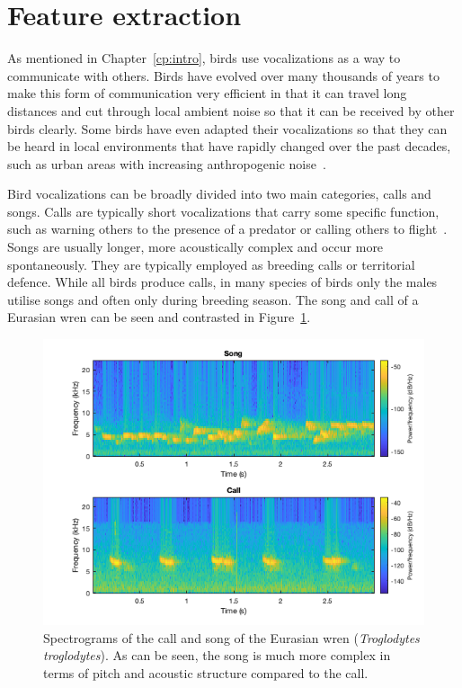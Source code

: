 \section{Feature extraction}\label{sec:feat_extraction}

As mentioned in Chapter~\ref{cp:intro}, birds use vocalizations as a way to
communicate with others. Birds have evolved over many thousands of years to make
this form of communication very efficient in that it can travel long distances
and cut through local ambient noise so that it can be received by other birds
clearly. Some birds have even adapted their vocalizations so that they can be
heard in local environments that have rapidly changed over the past decades,
such as urban areas with increasing anthropogenic noise~\cite{luther2010urban}.

Bird vocalizations can be broadly divided into two main categories, calls and
songs. Calls are typically short vocalizations that carry some specific
function, such as warning others to the presence of a predator or calling others
to flight~\cite{MARLER2004132}. Songs are usually longer, more acoustically
complex and occur more spontaneously. They are typically employed as breeding
calls or territorial defence. While all birds produce calls, in many species of
birds only the males utilise songs and often only during breeding season. The
song and call of a Eurasian wren can be seen and contrasted in
Figure~\ref{fig:wren_call_song_spectrogram}.

\begin{figure}[ht]
  \centering
  \includegraphics[width=\textwidth]{figures/wren_call_song_spectrogram.png}
  \caption{Spectrograms of the call and song of the Eurasian wren
    (\textit{Troglodytes troglodytes}). As can be seen, the song is much more complex in terms of pitch and acoustic structure compared to the
  call.}\label{fig:wren_call_song_spectrogram}
\end{figure}

